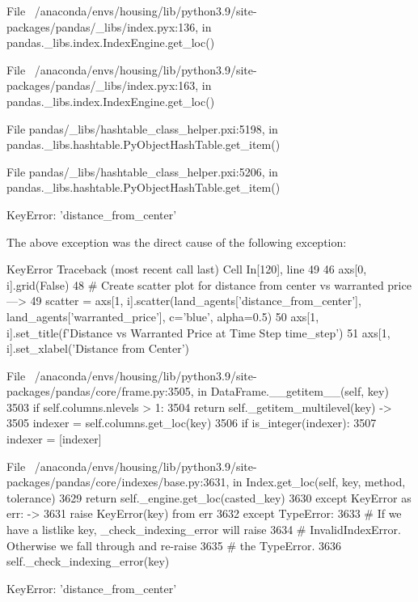 File ~/anaconda/envs/housing/lib/python3.9/site-packages/pandas/_libs/index.pyx:136, in pandas._libs.index.IndexEngine.get_loc()

File ~/anaconda/envs/housing/lib/python3.9/site-packages/pandas/_libs/index.pyx:163, in pandas._libs.index.IndexEngine.get_loc()

File pandas/_libs/hashtable_class_helper.pxi:5198, in pandas._libs.hashtable.PyObjectHashTable.get_item()

File pandas/_libs/hashtable_class_helper.pxi:5206, in pandas._libs.hashtable.PyObjectHashTable.get_item()

KeyError: 'distance_from_center'

The above exception was the direct cause of the following exception:

KeyError                                  Traceback (most recent call last)
Cell In[120], line 49
     46 axs[0, i].grid(False)
     48 # Create scatter plot for distance from center vs warranted price
---> 49 scatter = axs[1, i].scatter(land_agents['distance_from_center'], land_agents['warranted_price'], c='blue', alpha=0.5)
     50 axs[1, i].set_title(f'Distance vs Warranted Price at Time Step {time_step}')
     51 axs[1, i].set_xlabel('Distance from Center')

File ~/anaconda/envs/housing/lib/python3.9/site-packages/pandas/core/frame.py:3505, in DataFrame.__getitem__(self, key)
   3503 if self.columns.nlevels > 1:
   3504     return self._getitem_multilevel(key)
-> 3505 indexer = self.columns.get_loc(key)
   3506 if is_integer(indexer):
   3507     indexer = [indexer]

File ~/anaconda/envs/housing/lib/python3.9/site-packages/pandas/core/indexes/base.py:3631, in Index.get_loc(self, key, method, tolerance)
   3629     return self._engine.get_loc(casted_key)
   3630 except KeyError as err:
-> 3631     raise KeyError(key) from err
   3632 except TypeError:
   3633     # If we have a listlike key, _check_indexing_error will raise
   3634     #  InvalidIndexError. Otherwise we fall through and re-raise
   3635     #  the TypeError.
   3636     self._check_indexing_error(key)

KeyError: 'distance_from_center'